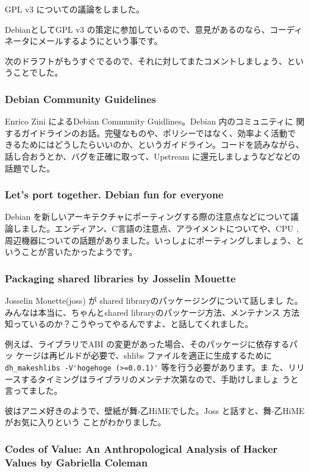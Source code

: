 \documentclass[mingoth,a4paper]{jsarticle}
\begin{document}
GPL v3 についての議論をしました。

DebianとしてGPL v3 の策定に参加しているので、意見があるのなら、コーディ
ネータにメールするようにという事です。

次のドラフトがもうすぐでるので、それに対してまたコメントしましょう、とい
うことでした。

\subsubsection{Debian Community Guidelines}

Enrico Zini によるDebian Community Guidlines。Debian 内のコミュニティに
関するガイドラインのお話。完璧なものや、ポリシーではなく、効率よく活動で
きるためにはどうしたらいいのか、というガイドライン。コードを読みながら、
話し合おうとか、バグを正確に取って、Upstream に還元しましょうなどなどの
話題でした。

\subsubsection{Let's port together. Debian fun for everyone}

Debian を新しいアーキテクチャにポーティングする際の注意点などについて議
論しました。エンディアン、C言語の注意点、アライメントについてや、CPU , 
周辺機器についての話題がありました。いっしょにポーティングしましょう、と
いうことが言いたかったようです。

\subsubsection{Packaging shared libraries by Josselin Mouette}

Josselin Mouette(joss) が shared libraryのパッケージングについて話しまし
た。みんなは本当に、ちゃんとshared libraryのパッケージ方法、メンテナンス
方法知っているのか？こうやってやるんですよ、と話してくれました。

例えば、ライブラリでABI の変更があった場合、そのパッケージに依存するパッ
ケージは再ビルドが必要で、shlibs ファイルを適正に生成するために 
\verb!dh_makeshlibs -V'hogehoge (>=0.0.1)'! 等を行う必要があります。ま
た、リリースするタイミングはライブラリのメンテナ次第なので、手助けしましょ
うと言ってました。

彼はアニメ好きのようで、壁紙が舞-乙HiMEでした。Joss と話すと、舞-乙HiMEがお気に入りという
ことがわかりました。

\subsubsection{Codes of Value: An Anthropological Analysis of Hacker Values by Gabriella Coleman}
\end{document}
